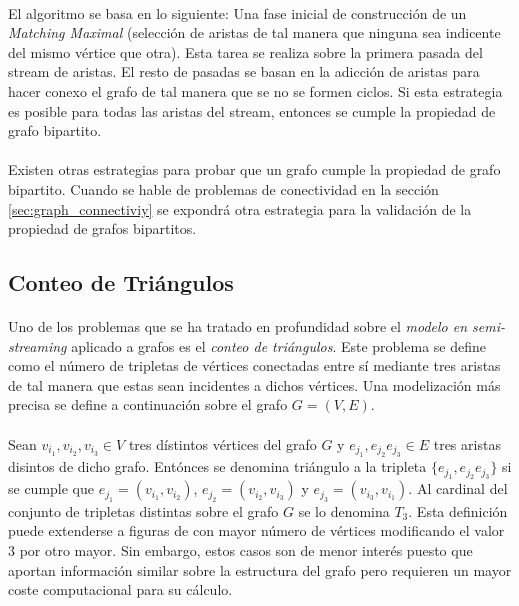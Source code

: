 \documentclass{subfiles}
\begin{document}
        \paragraph{}
        El algoritmo se basa en lo siguiente: Una fase inicial de construcción de un \emph{Matching Maximal} (selección de aristas de tal manera que ninguna sea indicente del mismo vértice que otra). Esta tarea se realiza sobre la primera pasada del stream de aristas. El resto de pasadas se basan en la adicción de aristas para hacer conexo el grafo de tal manera que se no se formen ciclos. Si esta estrategia es posible para todas las aristas del stream, entonces se cumple la propiedad de grafo bipartito.

        \paragraph{}
        Existen otras estrategias para probar que un grafo cumple la propiedad de grafo bipartito. Cuando se hable de problemas de conectividad en la sección \ref{sec:graph_connectiviy} se expondrá otra estrategia para la validación de la propiedad de grafos bipartitos.


      \subsection{Conteo de Triángulos}
      \label{sec:counting_triangles}

        \paragraph{}
        Uno de los problemas que se ha tratado en profundidad sobre el \emph{modelo en semi-streaming} aplicado a grafos es el \emph{conteo de triángulos}. Este problema se define como el número de tripletas de vértices conectadas entre sí mediante tres aristas de tal manera que estas sean incidentes a dichos vértices. Una modelización más precisa se define a continuación sobre el grafo $G=(V,E)$.

        \paragraph{}
        Sean $v_{i_1},v_{i_2},v_{i_3} \in V$ tres dístintos vértices del grafo $G$ y $e_{j_1}, e_{j_2} e_{j_3} \in E$ tres aristas disintos de dicho grafo. Entónces se denomina triángulo a la tripleta $\{e_{j_1}, e_{j_2} e_{j_3}\}$ si se cumple que $e_{j_1} = (v_{i_1},v_{i_2})$, $e_{j_2} = (v_{i_2},v_{i_3})$ y $e_{j_3} = (v_{i_3},v_{i_1})$. Al cardinal del conjunto de tripletas distintas sobre el grafo $G$ se lo denomina $T_3$. Esta definición puede extenderse a figuras de con mayor número de vértices modificando el valor $3$ por otro mayor. Sin embargo, estos casos son de menor interés puesto que aportan información similar sobre la estructura del grafo pero requieren un mayor coste computacional para su cálculo.
\end{document}
